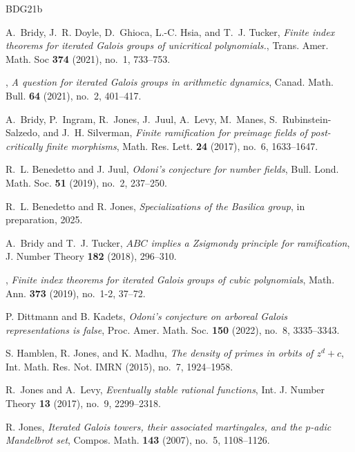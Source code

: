 \documentclass[11pt]{amsart}
\theoremstyle{definition}
\theoremstyle{definition}
\numberwithin{thm}{section}
\numberwithin{equation}{thm}
\begin{document}
\begin{thebibliography}{BDG{\etalchar{+}}21b}

A.~Bridy, J.~R. Doyle, D.~Ghioca, L.-C. Hsia, and T.~J. Tucker, \emph{Finite
  index theorems for iterated {G}alois groups of unicritical polynomials.},
  Trans. Amer. Math. Soc \textbf{374} (2021), no.~1, 733--753.

\bysame, \emph{A question for iterated {G}alois groups in arithmetic dynamics},
  Canad. Math. Bull. \textbf{64} (2021), no.~2, 401--417.

A.~Bridy, P.~Ingram, R.~Jones, J.~Juul, A.~Levy, M.~Manes,
  S.~Rubinstein-Salzedo, and J.~H. Silverman, \emph{Finite ramification for
  preimage fields of post-critically finite morphisms}, Math. Res. Lett.
  \textbf{24} (2017), no.~6, 1633--1647.

R.~L. Benedetto and J. Juul, \emph{Odoni's conjecture for number
  fields}, Bull. Lond. Math. Soc. \textbf{51} (2019), no.~2, 237--250.

R.~L. Benedetto and R. Jones, \emph{Specializations of the {B}asilica
  group}, in preparation, 2025.  


A.~Bridy and T.~J. Tucker, \emph{{$ABC$} implies a {Z}sigmondy principle for
  ramification}, J. Number Theory \textbf{182} (2018), 296--310.

\bysame, \emph{Finite index theorems for iterated {G}alois groups of cubic
  polynomials}, Math. Ann. \textbf{373} (2019), no.~1-2, 37--72. 

P. Dittmann and B. Kadets, \emph{Odoni's conjecture on arboreal {G}alois
  representations is false}, Proc. Amer. Math. Soc. \textbf{150} (2022), no.~8,
  3335--3343.

S. Hamblen, R. Jones, and K. Madhu, \emph{The density of primes in
  orbits of {$z^d+c$}}, Int. Math. Res. Not. IMRN (2015), no.~7, 1924--1958.

R.~Jones and A.~Levy, \emph{Eventually stable rational functions}, Int. J.
  Number Theory \textbf{13} (2017), no.~9, 2299--2318.

R. Jones, \emph{Iterated {G}alois towers, their associated martingales, and
  the {$p$}-adic {M}andelbrot set}, Compos. Math. \textbf{143} (2007), no.~5,
  1108--1126.


\end{thebibliography}
\end{document}

